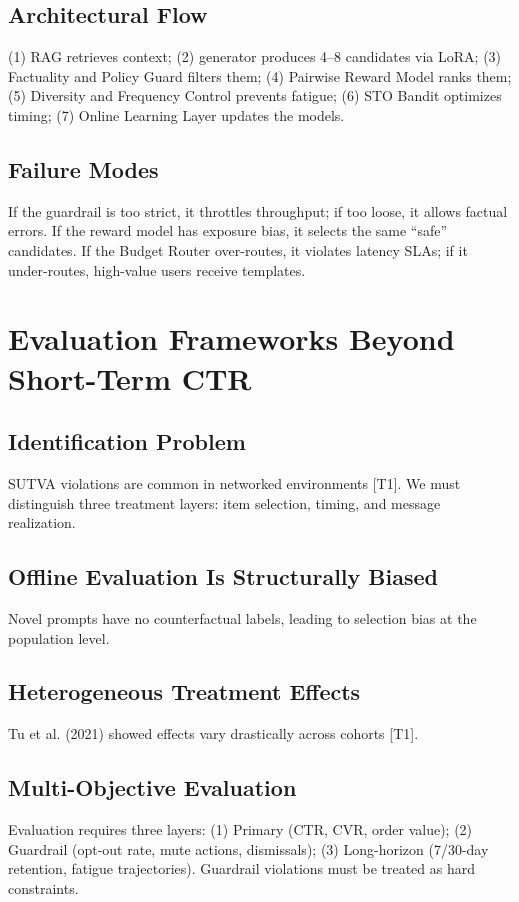 \documentclass[sigconf]{acmart}
\begin{document}
\subsection{Architectural Flow}
(1) RAG retrieves context; (2) generator produces 4--8 candidates via LoRA; (3) Factuality and Policy Guard filters them; (4) Pairwise Reward Model ranks them; (5) Diversity and Frequency Control prevents fatigue; (6) STO Bandit optimizes timing; (7) Online Learning Layer updates the models.

\subsection{Failure Modes}
If the guardrail is too strict, it throttles throughput; if too loose, it allows factual errors. If the reward model has exposure bias, it selects the same ``safe'' candidates. If the Budget Router over-routes, it violates latency SLAs; if it under-routes, high-value users receive templates.

\section{Evaluation Frameworks Beyond Short-Term CTR}

\subsection{Identification Problem}
SUTVA violations are common in networked environments \cite{luo2024survey} [T1]. We must distinguish three treatment layers: item selection, timing, and message realization.

\subsection{Offline Evaluation Is Structurally Biased}
Novel prompts have no counterfactual labels, leading to selection bias at the population level.

\subsection{Heterogeneous Treatment Effects}
Tu et al. (2021) showed effects vary drastically across cohorts \cite{tu2021personalized} [T1].

\subsection{Multi-Objective Evaluation}
Evaluation requires three layers: (1) Primary (CTR, CVR, order value); (2) Guardrail (opt-out rate, mute actions, dismissals); (3) Long-horizon (7/30-day retention, fatigue trajectories). Guardrail violations must be treated as hard constraints.
\end{document}
